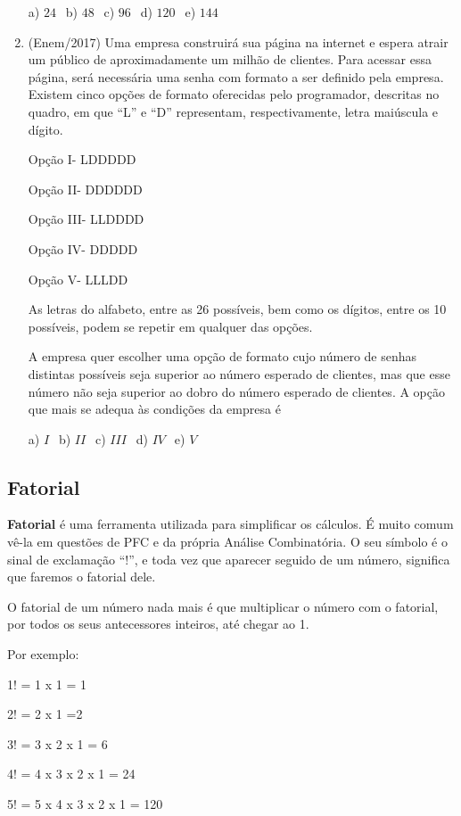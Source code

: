 \begin{multicols*}{2}
\begin{enumerate}
	a) $24 \ \ $ b) $48 \ \ $ c) $96 \ \ $ d) $120 \ \ $ e) $144 \ \ $		

	\item (Enem/2017) Uma empresa construirá sua página na internet e espera atrair um público de aproximadamente um milhão de clientes. Para acessar essa página, será necessária uma senha com formato a ser definido pela empresa. Existem cinco opções de formato oferecidas pelo programador, descritas no quadro, em que “L” e “D” representam, respectivamente, letra maiúscula e dígito.
	
Opção I- LDDDDD

Opção II- DDDDDD

Opção III- LLDDDD

Opção IV- DDDDD

Opção V- LLLDD

As letras do alfabeto, entre as 26 possíveis, bem como os dígitos, entre os 10 possíveis, podem se repetir em qualquer das opções.

A empresa quer escolher uma opção de formato cujo número de senhas distintas possíveis seja superior ao número esperado de clientes, mas que esse número não seja superior ao dobro do número esperado de clientes.
A opção que mais se adequa às condições da empresa é

	a) $ I \ \ $ b) $II \ \ $ c) $III \ \ $ d) $IV \ \ $ e) $V \ \ $
	
	\end{enumerate}

	\subsection{Fatorial}
	
\textbf{Fatorial} é uma ferramenta utilizada para simplificar os cálculos. É muito comum vê-la em questões de PFC e da própria Análise Combinatória. O seu símbolo é o sinal de exclamação “!”, e toda vez que aparecer seguido de um número, significa que faremos o fatorial dele. 

O fatorial de um número nada mais é que multiplicar o número com o fatorial, por todos os seus antecessores inteiros, até chegar ao 1.

Por exemplo: 

1! = 1 x 1 = 1

2! = 2 x 1 =2

3! = 3 x 2 x 1 = 6

4! = 4 x 3 x 2 x 1 = 24

5! = 5 x 4 x 3 x 2 x 1 = 120


\end{multicols*}
